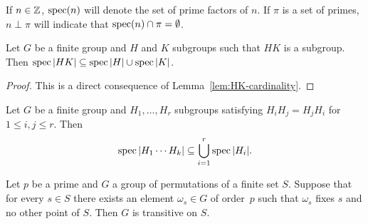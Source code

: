 \begin{ntn}
    If $n\in\mathbb{Z}$, $\operatorname{spec}(n)$ will denote the set of prime factors of $n$. If $\pi$ is a set of primes, $n\perp\pi$ will indicate that $\operatorname{spec}(n)\cap\pi=\emptyset$.%
\end{ntn}

\begin{prop}\label{prop:pi-product}
    Let $G$ be a finite group and $H$ and $K$ subgroups such that $HK$ is a subgroup. Then $\operatorname{spec}\left\vert{HK}\right\vert\subseteq\operatorname{spec}\left\vert{H}\right\vert\cup\operatorname{spec}\left\vert{K}\right\vert$.
\end{prop}

\begin{proof}
    This is a direct consequence of Lemma~\ref{lem:HK-cardinality}.    
\end{proof}

\begin{cor}
    Let $G$ be a finite group and $H_1,\dots,H_r$ subgroups satisfying $H_iH_j=H_jH_i$ for $1\le i,j\le r$. Then
    \[
        \operatorname{spec}|H_1\cdots H_k|\subseteq\bigcup_{i=1}^r\operatorname{spec}|H_i|.
    \]
\end{cor}

\begin{lem}\label{lem:transitiviy-action}
    Let\/ $p$ be a prime and\/ $G$ a group of permutations of a finite set\/ $S$. Suppose that for every\/ $s\in S$ there exists an element\/ $\omega_s\in G$ of order\/~$p$ such that\/ $\omega_s$ fixes\/ $s$ and no other point of\/ $S$. Then\/ $G$ is transitive on\/ $S$.
\end{lem}

